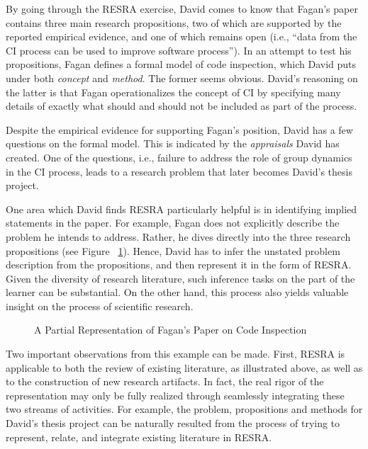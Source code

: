 By going through the RESRA exercise, David comes to know that Fagan's paper
contains three main research propositions, two of which are supported by
the reported empirical evidence, and one of which remains open (i.e.,
``data from the CI process can be used to improve software process''). In
an attempt to test his propositions, Fagan defines a formal model of code
inspection, which David puts under both {\it concept\/} and {\it method\/}.
The former seems obvious. David's reasoning on the latter is that Fagan
operationalizes the concept of CI by specifying many details of exactly
what should and should not be included as part of the process.

Despite the empirical evidence for supporting Fagan's position, David has a
few questions on the formal model. This is indicated by the {\it
appraisals\/} David has created.  One of the questions, i.e., failure to
address the role of group dynamics in the CI process, leads to a research
problem that later becomes David's thesis project.

One area which David finds RESRA particularly helpful is in identifying
implied statements in the paper. For example, Fagan does not explicitly
describe the problem he intends to address. Rather, he dives directly into
the three research propositions (see Figure ~\ref{fig-eg1}). Hence, David
has to infer the unstated problem description from the propositions, and
then represent it in the form of RESRA. Given the diversity of research
literature, such inference tasks on the part of the learner can be
substantial. On the other hand, this process also yields valuable insight
on the process of scientific research.

\begin{figure}[ht]
    \centerline{}
    \caption{A Partial Representation of Fagan's Paper on Code Inspection}
    \label{fig-eg1}
\end{figure}

Two important observations from this example can be made. First, RESRA is
applicable to both the review of existing literature, as illustrated above,
as well as to the construction of new research artifacts. In fact, the real
rigor of the representation may only be fully realized through seamlessly
integrating these two streams of activities. For example, the problem,
propositions and methods for David's thesis project can be naturally
resulted from the process of trying to represent, relate, and integrate
existing literature in RESRA.

